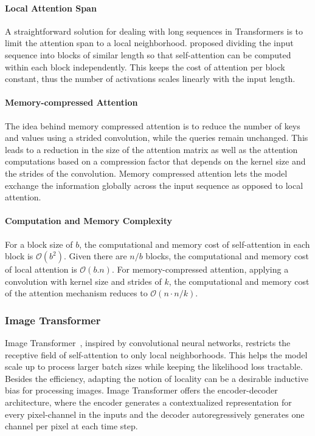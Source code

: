\paragraph{Local Attention Span} A straightforward solution for dealing with long sequences in Transformers is to limit the attention span to a local neighborhood. \citet{liu2018generating} proposed dividing the input sequence into blocks of similar length so that self-attention can be computed within each block independently. This keeps the cost of attention per block constant, thus the number of activations scales linearly with the input length. 

\paragraph{Memory-compressed Attention} The idea behind memory compressed attention is to reduce the number of keys and values using a strided convolution, while the queries remain unchanged. This leads to a reduction in the size of the attention matrix as well as the attention computations based on a compression factor that depends on the kernel size and the strides of the convolution. Memory compressed attention lets the model exchange the information globally across the input sequence as opposed to local attention. 

\paragraph{Computation and Memory Complexity} For a block size of $b$, the computational and memory cost of self-attention in each block is $\mathcal{O}(b^2)$. Given there are $n/b$ blocks, the computational and memory cost of local attention is $\mathcal{O}(b.n)$. For memory-compressed attention, applying a convolution with kernel size and strides of $k$, the computational and memory cost of the attention mechanism reduces to $\mathcal{O}(n \cdot n/k)$. 

\subsubsection{Image Transformer} Image Transformer~\citep{parmar2018image}, inspired by convolutional neural networks, restricts the receptive field of self-attention to only local neighborhoods. This helps the model scale up to process larger batch sizes while keeping the likelihood loss tractable. Besides the efficiency, adapting the notion of locality can be a desirable inductive bias for processing images. Image Transformer offers the encoder-decoder architecture, where the encoder generates a contextualized representation for every pixel-channel in the inputs and the decoder autoregressively generates one channel per pixel at each time step.

